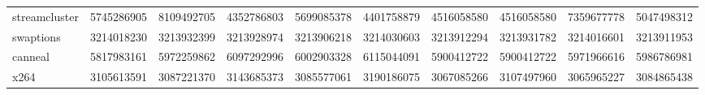 \begin{table}
\begin{tabular}{lrrrrrrrrr}
streamcluster & 5745286905 & 8109492705 & 4352786803 & 5699085378 & 4401758879 & 4516058580 & 4516058580 & 7359677778 & 5047498312 \\
swaptions & 3214018230 & 3213932399 & 3213928974 & 3213906218 & 3214030603 & 3213912294 & 3213931782 & 3214016601 & 3213911953 \\
canneal & 5817983161 & 5972259862 & 6097292996 & 6002903328 & 6115044091 & 5900412722 & 5900412722 & 5971966616 & 5986786981 \\
x264 & 3105613591 & 3087221370 & 3143685373 & 3085577061 & 3190186075 & 3067085266 & 3107497960 & 3065965227 & 3084865438 \\
\bottomrule
\end{tabular}
\end{table}
